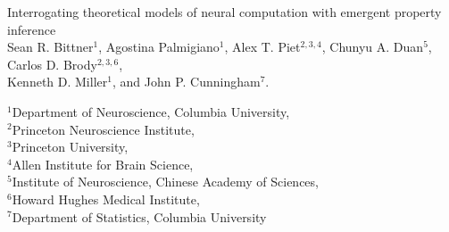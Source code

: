 \documentclass[11pt]{article}
\begin{document}
\medskip        

\thispagestyle{plain}
{\Large Interrogating theoretical models of neural computation with emergent property inference} \\
Sean R. Bittner$^{1}$, Agostina Palmigiano$^{1}$, Alex T. Piet$^{2,3,4}$, Chunyu A. Duan$^{5}$, Carlos D. Brody$^{2,3,6}$, \\
Kenneth D. Miller$^{1}$, and John P. Cunningham$^{7}$.

{\small
$^{1}$Department of Neuroscience, Columbia University, \\
$^{2}$Princeton Neuroscience Institute, \\
$^{3}$Princeton University, \\
$^{4}$Allen Institute for Brain Science, \\
$^{5}$Institute of Neuroscience, Chinese Academy of Sciences, \\
$^{6}$Howard Hughes Medical Institute, \\
$^{7}$Department of Statistics, Columbia University
}

\linenumbers
\end{document}
